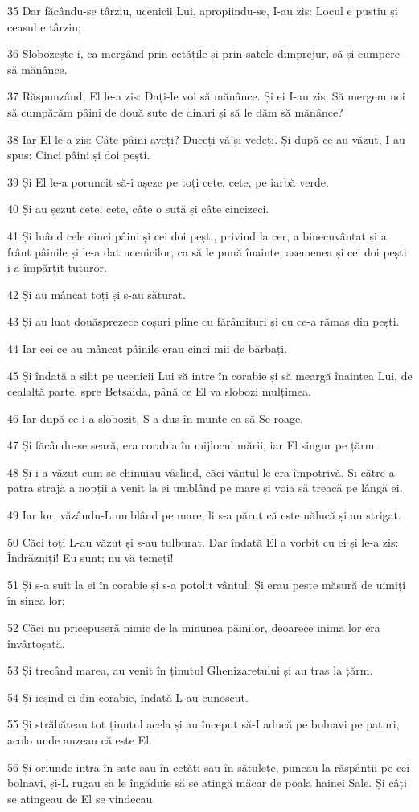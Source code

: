 \par 35 Dar făcându-se târziu, ucenicii Lui, apropiindu-se, I-au zis: Locul e pustiu și ceasul e târziu;
\par 36 Slobozește-i, ca mergând prin cetățile și prin satele dimprejur, să-și cumpere să mănânce.
\par 37 Răspunzând, El le-a zis: Dați-le voi să mănânce. Și ei I-au zis: Să mergem noi să cumpărăm pâini de două sute de dinari și să le dăm să mănânce?
\par 38 Iar El le-a zis: Câte pâini aveți? Duceți-vă și vedeți. Și după ce au văzut, I-au spus: Cinci pâini și doi pești.
\par 39 Și El le-a poruncit să-i așeze pe toți cete, cete, pe iarbă verde.
\par 40 Și au șezut cete, cete, câte o sută și câte cincizeci.
\par 41 Și luând cele cinci pâini și cei doi pești, privind la cer, a binecuvântat și a frânt pâinile și le-a dat ucenicilor, ca să le pună înainte, asemenea și cei doi pești i-a împărțit tuturor.
\par 42 Și au mâncat toți și s-au săturat.
\par 43 Și au luat douăsprezece coșuri pline cu fărâmituri și cu ce-a rămas din pești.
\par 44 Iar cei ce au mâncat pâinile erau cinci mii de bărbați.
\par 45 Și îndată a silit pe ucenicii Lui să intre în corabie și să meargă înaintea Lui, de cealaltă parte, spre Betsaida, până ce El va slobozi mulțimea.
\par 46 Iar după ce i-a slobozit, S-a dus în munte ca să Se roage.
\par 47 Și făcându-se seară, era corabia în mijlocul mării, iar El singur pe țărm.
\par 48 Și i-a văzut cum se chinuiau vâslind, căci vântul le era împotrivă. Și către a patra strajă a nopții a venit la ei umblând pe mare și voia să treacă pe lângă ei.
\par 49 Iar lor, văzându-L umblând pe mare, li s-a părut că este nălucă și au strigat.
\par 50 Căci toți L-au văzut și s-au tulburat. Dar îndată El a vorbit cu ei și le-a zis: Îndrăzniți! Eu sunt; nu vă temeți!
\par 51 Și s-a suit la ei în corabie și s-a potolit vântul. Și erau peste măsură de uimiți în sinea lor;
\par 52 Căci nu pricepuseră nimic de la minunea pâinilor, deoarece inima lor era învârtoșată.
\par 53 Și trecând marea, au venit în ținutul Ghenizaretului și au tras la țărm.
\par 54 Și ieșind ei din corabie, îndată L-au cunoscut.
\par 55 Și străbăteau tot ținutul acela și au început să-I aducă pe bolnavi pe paturi, acolo unde auzeau că este El.
\par 56 Și oriunde intra în sate sau în cetăți sau în sătulețe, puneau la răspântii pe cei bolnavi, și-L rugau să le îngăduie să se atingă măcar de poala hainei Sale. Și câți se atingeau de El se vindecau.

